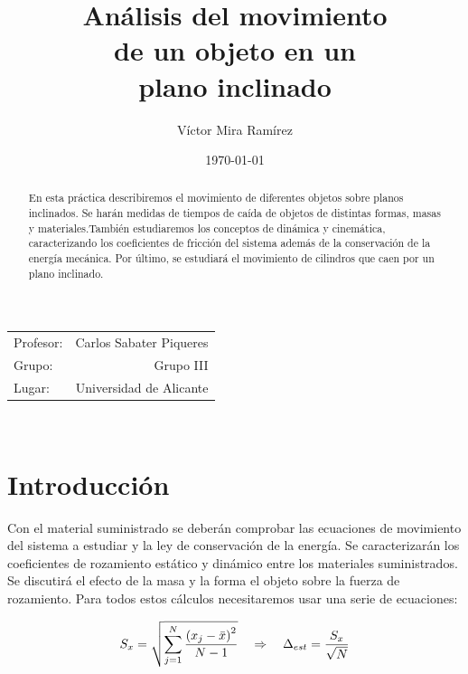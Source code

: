 \documentclass{article}
\title{\textrm{\textbf{\LARGE Análisis del movimiento \\ de un objeto en un \\ plano inclinado}}} %
\author{Víctor Mira Ramírez} %
\date{\today} %
\begin{document}
\maketitle %

\begin{center}
\begin{tabular}{l r}

Profesor: & Carlos Sabater Piqueres\\
Grupo: & Grupo III \\
Lugar: & Universidad de Alicante
\end{tabular}
\end{center}

\hfill \break \\

\tableofcontents

\pagebreak

\begin{abstract}
En esta práctica describiremos el movimiento de diferentes objetos sobre planos inclinados. Se harán medidas de tiempos de caída de objetos de distintas formas, masas y materiales.También estudiaremos los conceptos de dinámica y cinemática, caracterizando los coeficientes de fricción del sistema además de la conservación de la energía mecánica. Por último, se estudiará el movimiento de cilindros que caen por un plano inclinado.
\end{abstract}

\section{Introducción}
Con el material suministrado se deberán comprobar las ecuaciones de movimiento del sistema a estudiar y la ley de conservación de la energía.
Se caracterizarán los coeficientes de rozamiento estático y dinámico entre los materiales suministrados. Se discutirá el efecto de la masa y la forma el objeto sobre la fuerza de rozamiento.
Para todos estos cálculos necesitaremos usar una serie de ecuaciones:

\begin{equation}\label{eq:varianza}
    \centering
    S_x = \sqrt{\sum_{j=1}^{N}\frac{\left(x_j - \bar{x}\right)^2}{N-1}} \quad \Rightarrow \quad
    \Delta_{est} = \frac{S_x}{\sqrt{N}}
\end{equation}
\end{document}
